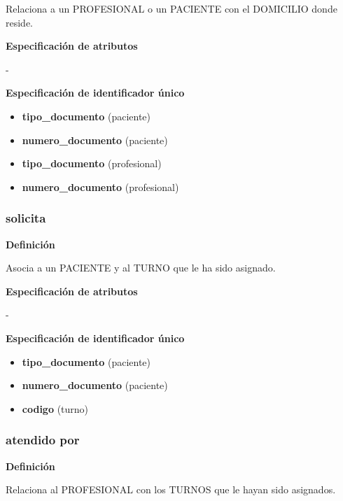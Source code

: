 \documentclass[a4paper,11pt]{article}
\begin{document}
Relaciona a un PROFESIONAL o un PACIENTE con el DOMICILIO donde reside.

\textbf{Especificación de atributos}

-

\textbf{Especificación de identificador único}

\begin{itemize}

     \item \textbf{tipo\_documento} (paciente)

     \item \textbf{numero\_documento} (paciente)

     \item \textbf{tipo\_documento} (profesional)

     \item \textbf{numero\_documento} (profesional)

\end{itemize}

\subsubsection{\textbf{solicita}}

\textbf{Definición}

Asocia a un PACIENTE y al TURNO que le ha sido asignado.

\textbf{Especificación de atributos}

-

\textbf{Especificación de identificador único}

\begin{itemize}

     \item \textbf{tipo\_documento} (paciente)

     \item \textbf{numero\_documento} (paciente)

     \item \textbf{codigo} (turno)

\end{itemize}

\subsubsection{\textbf{atendido por}}

\textbf{Definición}

Relaciona al PROFESIONAL con los TURNOS que le hayan sido asignados.
\end{document}
